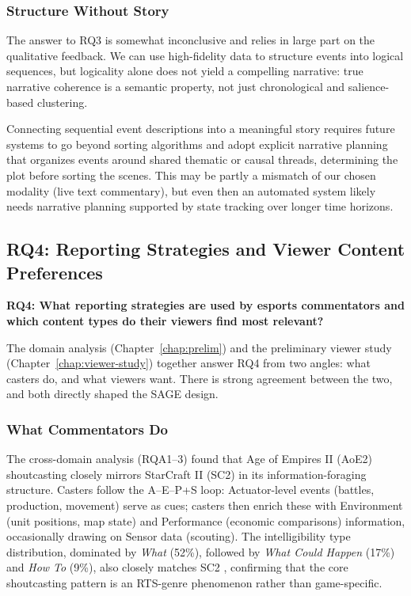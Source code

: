 \subsubsection{Structure Without Story}
The answer to RQ3 is somewhat inconclusive and relies in large part on the qualitative feedback. We can use high-fidelity data to structure events into logical sequences, but logicality alone does not yield a compelling narrative: true narrative coherence is a semantic property, not just chronological and salience-based clustering.

Connecting sequential event descriptions into a meaningful story requires future systems to go beyond sorting algorithms and adopt explicit narrative planning that organizes events around shared thematic or causal threads, determining the plot before sorting the scenes. This may be partly a mismatch of our chosen modality (live text commentary), but even then an automated system likely needs narrative planning supported by state tracking over longer time horizons.

\subsection{RQ4: Reporting Strategies and Viewer Content Preferences}
\textbf{RQ4: What reporting strategies are used by esports commentators and which content types do their viewers find most relevant?}

The domain analysis (Chapter~\ref{chap:prelim}) and the preliminary viewer study (Chapter~\ref{chap:viewer-study}) together answer RQ4 from two angles: what casters do, and what viewers want. There is strong agreement between the two, and both directly shaped the SAGE design.

\subsubsection{What Commentators Do}
The cross-domain analysis (RQA1--3) found that Age of Empires II (AoE2) shoutcasting closely mirrors StarCraft II (SC2) in its information-foraging structure. Casters follow the A--E--P+S loop: Actuator-level events (battles, production, movement) serve as cues; casters then enrich these with Environment (unit positions, map state) and Performance (economic comparisons) information, occasionally drawing on Sensor data (scouting). The intelligibility type distribution, dominated by \textit{What} (52\%), followed by \textit{What Could Happen} (17\%) and \textit{How To} (9\%), also closely matches SC2 \cite{dodge2018}, confirming that the core shoutcasting pattern is an RTS-genre phenomenon rather than game-specific.

